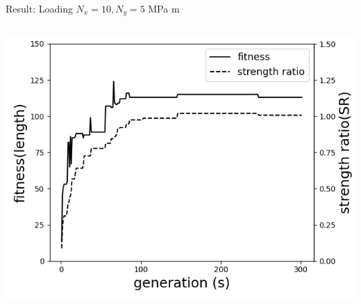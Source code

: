 \documentclass{beamer}
\begin{document}
\begin{frame}{Result: Loading $N_x = 10, N_y=5 $ MPa m}
    \begin{columns}
    \begin{column}{0.5\textwidth}

        \begin{center}
            \includegraphics[width=1.0\linewidth]{2020-11-10-pre-image/Three_distinct_angles_fitness_and_sr.png}
        \end{center}


\end{column}
\end{columns}
\end{frame}
\end{document}
